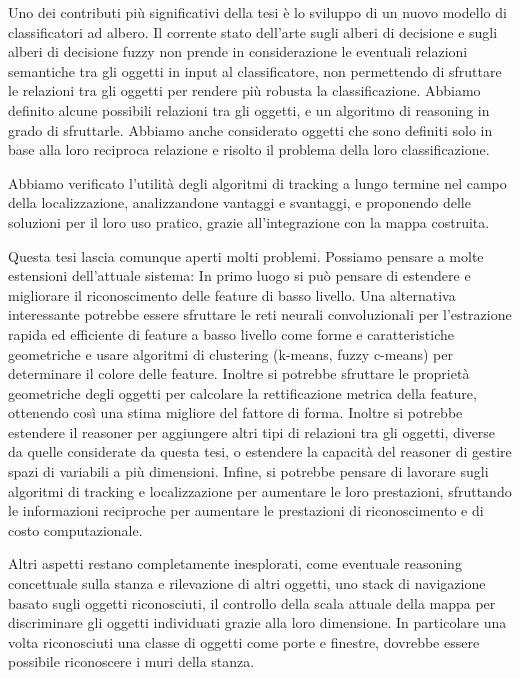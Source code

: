 Uno dei contributi più significativi della tesi è lo sviluppo di un nuovo modello di classificatori ad albero. Il corrente stato dell'arte sugli alberi di decisione e sugli alberi di decisione fuzzy non prende in considerazione le eventuali relazioni semantiche tra gli oggetti in input al classificatore, non permettendo di sfruttare le relazioni tra gli oggetti per rendere più robusta la classificazione.
Abbiamo definito alcune possibili relazioni tra gli oggetti, e un algoritmo di reasoning in grado di sfruttarle. Abbiamo anche considerato oggetti che sono definiti solo in base alla loro reciproca relazione e risolto il problema della loro classificazione.

Abbiamo verificato l'utilità degli algoritmi di tracking a lungo termine nel campo della localizzazione, analizzandone vantaggi e svantaggi, e proponendo delle soluzioni per il loro uso pratico, grazie all'integrazione con la mappa costruita.

Questa tesi lascia comunque aperti molti problemi. Possiamo pensare a molte estensioni dell'attuale sistema:
In primo luogo si può pensare di estendere e migliorare il riconoscimento delle feature di basso livello. Una alternativa interessante potrebbe essere sfruttare le reti neurali convoluzionali per l'estrazione rapida ed efficiente di feature a basso livello come forme e caratteristiche geometriche e usare algoritmi di clustering (k-means, fuzzy c-means) per determinare il colore delle feature. Inoltre si potrebbe sfruttare le proprietà geometriche degli oggetti per calcolare la rettificazione metrica della feature, ottenendo così una stima migliore del fattore di forma.
Inoltre si potrebbe estendere il reasoner per aggiungere altri tipi di relazioni tra gli oggetti, diverse da quelle considerate da questa tesi, o estendere la capacità del reasoner di gestire spazi di variabili a più dimensioni.
Infine, si potrebbe pensare di lavorare sugli algoritmi di tracking e localizzazione per aumentare le loro prestazioni, sfruttando le informazioni reciproche per aumentare le prestazioni di riconoscimento e di costo computazionale.

Altri aspetti restano completamente inesplorati, come eventuale reasoning concettuale sulla stanza e rilevazione di altri oggetti, uno stack di navigazione basato sugli oggetti riconosciuti, il controllo della scala attuale della mappa per discriminare gli oggetti individuati grazie alla loro dimensione. In particolare una volta riconosciuti una classe di oggetti come porte e finestre, dovrebbe essere possibile riconoscere i muri della stanza.
